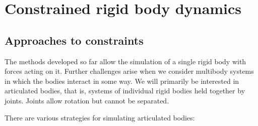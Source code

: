 \section{Constrained rigid body dynamics\label{constraints}}

\subsection{Approaches to constraints\label{approachesToConstraints}}
The methods developed so far allow the simulation of a single rigid body with forces
acting on it. Further challenges arise when we consider multibody systems in which the bodies
interact in some way. We will primarily be interested in articulated bodies, that is, systems
of individual rigid bodies held together by joints. Joints allow rotation but cannot be
separated.

There are various strategies for simulating articulated bodies:

